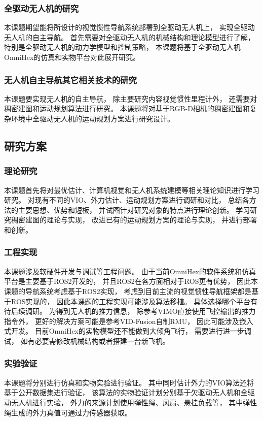 \subsubsection{全驱动无人机的研究}
本课题期望能将所设计的视觉惯性导航系统部署到全驱动无人机上，
实现全驱动无人机的自主导航。
首先需要对全驱动无人机的机械结构和理论模型进行了解，
特别是全驱动无人机的动力学模型和控制策略，
本课题将基于全驱动无人机OmniHex的仿真和实物平台对此展开研究。

\subsubsection{无人机自主导航其它相关技术的研究}
本课题要实现无人机的自主导航，
除主要研究内容视觉惯性里程计外，
还需要对稠密建图和运动规划算法进行研究。
本课题将对基于RGB-D相机的稠密建图和复杂环境中全驱动无人机的运动规划方案进行研究设计。

\subsection{研究方案}
\subsubsection{理论研究}
本课题首先将对最优估计、计算机视觉和无人机系统建模等相关理论知识进行学习研究。
对现有不同的VIO、外力估计、运动规划方案进行调研和对比，
总结各方法的主要思想、优势和短板，
并试图针对研究对象的特点进行理论创新。
学习研究稠密建图的理论与实现，
改进已有的运动规划方案的理论与实现，
并进行部署和创新。

\subsubsection{工程实现}
本课题涉及软硬件开发与调试等工程问题。
由于当前OmniHex的软件系统和仿真平台是主要基于ROS2开发的，
并且ROS2在各方面相对于ROS更有优势，
因此本课题的导航系统考虑基于ROS2实现，
考虑到目前主流的视觉惯性导航框架都是基于ROS实现的，
因此本课题的工程实现可能涉及算法移植。
具体选择哪个平台有待后续调研。
为得到无人机的推力信息，
除参考VIMO直接使用飞控输出的推力指令外，
更好的解决方案可能是参考VID-Fusion自制RMU，
因此可能涉及嵌入式开发。
目前OmniHex的实物模型还不能做到大倾角飞行，
需要进行进一步调试，
如有必要需修改机械结构或者搭建一台新飞机。

\subsubsection{实验验证}
本课题将分别进行仿真和实物实验进行验证。
其中同时估计外力的VIO算法还将基于公开数据集进行验证，
该算法的实物验证计划分别基于欠驱动无人机和全驱动无人机进行实验，
外力的来源计划使用弹性绳、风扇、悬挂负载等，
其中弹性绳生成的外力真值可通过力传感器获取。

